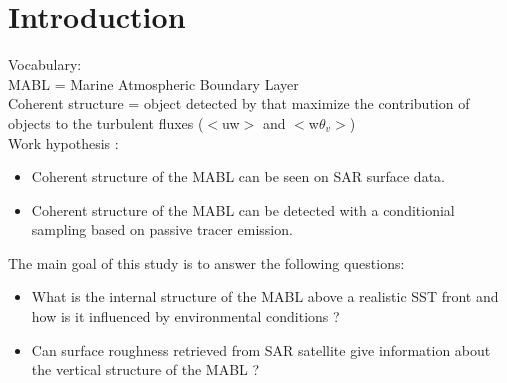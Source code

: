 \documentclass[draft]{agujournal2019} %
\begin{document}
				
				
				
				
				
        \section{Introduction}
        \label{section_introduction}
        
        Vocabulary:\\
        MABL = Marine Atmospheric Boundary Layer \\
        Coherent structure = object detected by \cite{couvreux_resolved_2010} that maximize the contribution of objects to the turbulent fluxes ($<$uw$>$ and $<$w$\theta_v$$>$)\\

        Work hypothesis :
        \begin{itemize}
            \item Coherent structure of the MABL can be seen on SAR surface data.
            \item Coherent structure of the MABL can be detected with a conditionial sampling based on passive tracer emission.
        \end{itemize}

        The main goal of this study is to answer the following questions:
        \begin{itemize}
            \item What is the internal structure of the MABL above a realistic SST front and how is it influenced by environmental conditions ?
            \item Can surface roughness retrieved from SAR satellite give information about the vertical structure of the MABL ?
        \end{itemize}
        
\end{document}
